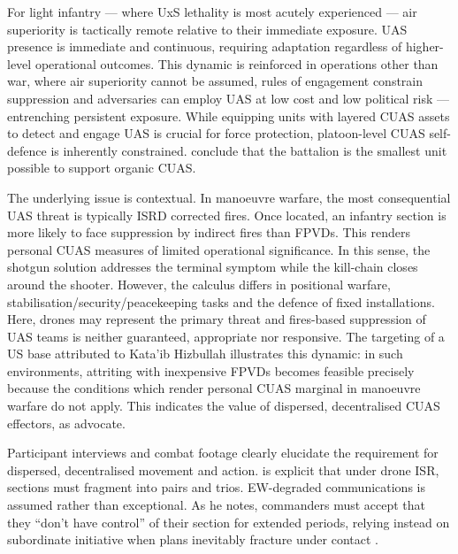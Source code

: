 For light infantry --- where UxS lethality is most acutely experienced --- air superiority is tactically remote relative to their immediate exposure. UAS presence is immediate and continuous, requiring adaptation regardless of higher-level operational outcomes. This dynamic is reinforced in operations other than war, where air superiority cannot be assumed, rules of engagement constrain suppression and adversaries can employ UAS at low cost and low political risk \parencite{WATLING_2024} --- entrenching persistent exposure. While equipping units with layered CUAS assets to detect and engage UAS is crucial for force protection, platoon-level CUAS self-defence is inherently constrained. \textcite[28]{WATLING_2024} conclude that the battalion is the smallest unit possible to support organic CUAS.

The underlying issue is contextual. In manoeuvre warfare, the most consequential UAS threat is typically ISRD corrected fires. Once located, an infantry section is more likely to face suppression by indirect fires than FPVDs. This renders personal CUAS measures of limited operational significance. In this sense, the shotgun solution addresses the terminal symptom while the kill-chain closes around the shooter. However, the calculus differs in positional warfare, stabilisation/security/peacekeeping tasks and the defence of fixed installations. Here, drones may represent the primary threat and fires-based suppression of UAS teams is neither guaranteed, appropriate nor responsive. The targeting of a US base attributed to Kata'ib Hizbullah illustrates this dynamic: in such environments, attriting with inexpensive FPVDs becomes feasible precisely because the conditions which render personal CUAS marginal in manoeuvre warfare do not apply. This indicates the value of dispersed, decentralised CUAS effectors, as \textcite[5]{hinote_ryan_2024} advocate.





Participant interviews and combat footage clearly elucidate the requirement for dispersed, decentralised movement and action. \textcite{darragh_participant_4} is explicit that under drone ISR, sections must fragment into pairs and trios. EW-degraded communications is assumed rather than exceptional. As he notes, commanders must accept that they ``don't have control'' of their section for extended periods, relying instead on subordinate initiative when plans inevitably fracture under contact \parencite{darragh_participant_4}. 


